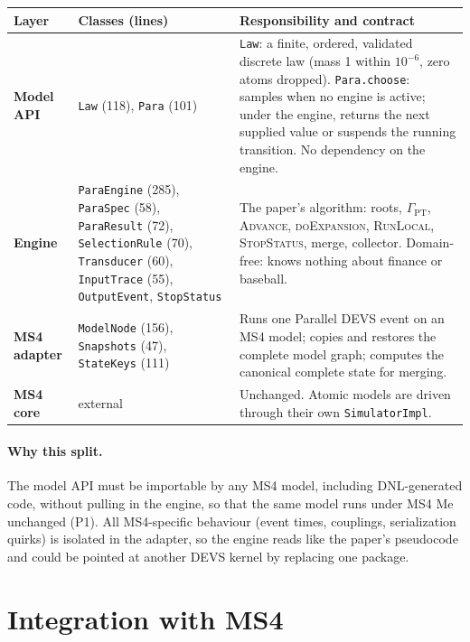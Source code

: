 \documentclass[11pt]{article}
\newcommand{\code}[1]{\texttt{#1}}
\begin{document}
\begin{center}
\small
\begin{tabularx}{\linewidth}{@{}>{\bfseries}p{2.3cm} p{3.6cm} Y@{}}
\toprule
Layer & Classes (lines) & Responsibility and contract\\
\midrule
Model API & \code{Law} (118), \code{Para} (101) &
  \code{Law}: a finite, ordered, validated discrete law (mass 1 within $10^{-6}$, zero atoms dropped).
  \code{Para.choose}: samples when no engine is active; under the engine, returns the next supplied value or
  suspends the running transition. No dependency on the engine.\\
Engine & \code{ParaEngine} (285), \code{ParaSpec} (58), \code{ParaResult} (72), \code{SelectionRule} (70),
  \code{Transducer} (60), \code{InputTrace} (55), \code{OutputEvent}, \code{StopStatus} &
  The paper's algorithm: roots, $\Gamma_{\mathrm{PT}}$, \textsc{Advance}, \textsc{doExpansion}, \textsc{RunLocal},
  \textsc{StopStatus}, merge, collector. Domain-free: knows nothing about finance or baseball.\\
MS4 adapter & \code{ModelNode} (156), \code{Snapshots} (47), \code{StateKeys} (111) &
  Runs one Parallel DEVS event on an MS4 model; copies and restores the complete model graph; computes the canonical
  complete state for merging.\\
MS4 core & external &
  Unchanged. Atomic models are driven through their own \code{SimulatorImpl}.\\
\bottomrule
\end{tabularx}
\end{center}

\paragraph{Why this split.} The model API must be importable by any MS4 model, including DNL-generated code, without
pulling in the engine, so that the same model runs under MS4 Me unchanged (P1). All MS4-specific behaviour (event
times, couplings, serialization quirks) is isolated in the adapter, so the engine reads like the paper's pseudocode and
could be pointed at another DEVS kernel by replacing one package.

\section{Integration with MS4}
\end{document}
